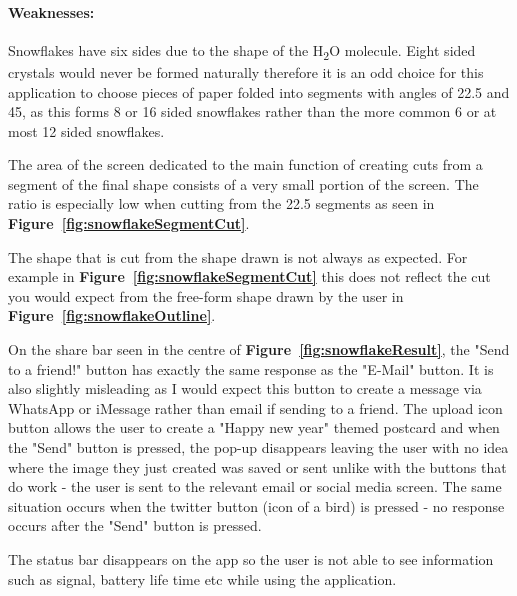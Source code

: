 \documentclass[11pt]{article}
\begin{document}
                \paragraph{Weaknesses:}
                Snowflakes have six sides due to the shape of the H\textsubscript{2}O molecule. Eight sided crystals would never be formed naturally %
                therefore it is an odd choice for this application to choose pieces of paper folded into segments with angles of 22.5\textdegree{} and 45\textdegree{}, as this forms 8 or 16 sided snowflakes rather than the more common 6 or at most 12 sided snowflakes.
                
                The area of the screen dedicated to the main function of creating cuts from a segment of the final shape consists of a very small portion of the screen. The ratio is especially low when cutting from the 22.5\textdegree{} segments as seen in \textbf{Figure~\ref{fig:snowflakeSegmentCut}}.
                
                The shape that is cut from the shape drawn is not always as expected. For example in \textbf{Figure~\ref{fig:snowflakeSegmentCut}} this does not reflect the cut you would expect from the free-form shape drawn by the user in \textbf{Figure~\ref{fig:snowflakeOutline}}.
               
                On the share bar seen in the centre of \textbf{Figure~\ref{fig:snowflakeResult}}, the "Send to a friend!" button has exactly the same response as the "E-Mail" button. It is also slightly  misleading as I would expect this button to create a message via WhatsApp or iMessage rather than email if sending to a friend. The upload icon button allows the user to create a "Happy new year" themed postcard and when the "Send" button is pressed, the pop-up disappears leaving the user with no idea where the image they just created was saved or sent unlike with the buttons that do work - the user is sent to the relevant email or social media screen. The same situation occurs when the twitter button (icon of a bird) is pressed - no response occurs after the "Send" button is pressed.
                
                The status bar disappears on the app so the user is not able to see information such as signal, battery life time etc while using the application. 
                 
\end{document}
